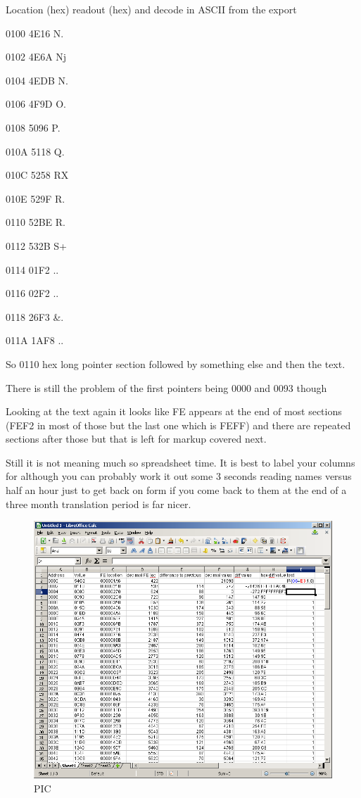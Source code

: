 \documentclass[
]{book}
\begin{document}
Location (hex) readout (hex) and decode in ASCII from the export

0100 4E16 N.

0102 4E6A Nj

0104 4EDB N.

0106 4F9D O.

0108 5096 P.

010A 5118 Q.

010C 5258 RX

010E 529F R.

0110 52BE R.

0112 532B S+

0114 01F2 ..

0116 02F2 ..

0118 26F3 \&.

011A 1AF8 ..

So 0110 hex long pointer section followed by something else and then the text.

There is still the problem of the first pointers being 0000 and 0093 though

Looking at the text again it looks like FE appears at the end of most sections (FEF2 in most of those but the last one which is FEFF) and there are repeated sections after those but that is left for markup covered next.

Still it is not meaning much so spreadsheet time. It is best to label your columns for although you can probably work it out some 3 seconds reading names versus half an hour just to get back on form if you come back to them at the end of a three month translation period is far nicer.

\begin{figure}
\centering
\includegraphics{images/104_home_fast6191_romhackingguide_unrenamed_fil____romhackingguidepointersexamplespreadsheet1.png}
\caption{PIC}
\end{figure}
\end{document}

